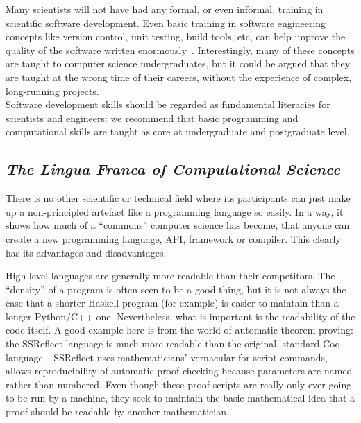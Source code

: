 \documentclass[a4paper,11pt]{article}
\begin{document}
Many scientists will not have had any formal, or even informal,
training in scientific software development. Even basic training in software engineering
concepts like version control, unit testing, build tools, etc, can help improve the
quality of the software written enormously~\cite{wilson2006}.
Interestingly, many of these concepts are taught to computer science
undergraduates, but it could be argued that they are taught at the
wrong time of their careers, without the experience of complex,
long-running projects.\\

 Software
development skills should be regarded as fundamental literacies for
scientists and engineers: we recommend that basic programming and
computational skills are taught as core at undergraduate and
postgraduate level.

\subsection{{\emph{The Lingua Franca of Computational Science}}}

There is no other scientific or technical field where its participants
can just make up a non-principled artefact like a programming language
so easily. In a way, it shows how much of a ``commons'' computer
science has become, that anyone can create a new programming language,
API, framework or compiler. This clearly has its advantages and
disadvantages.

High-level languages are generally more readable than their
competitors. The ``density'' of a program is often seen to be a good
thing, but it is not always the case that a shorter Haskell program
(for example) is easier to maintain than a longer Python/C++
one. Nevertheless, what is important is the readability of the code
itself. A good example here is from the world of automatic theorem
proving: the SSReflect language is much more readable than the
original, standard Coq language~\cite{GonthierZND13}. SSReflect uses
mathematicians' vernacular for script commands, allows reproducibility
of automatic proof-checking because parameters are named rather than
numbered.  Even though these proof scripts are really only ever going
to be run by a machine, they seek to maintain the basic mathematical
idea that a proof should be readable by another mathematician.
\end{document}
